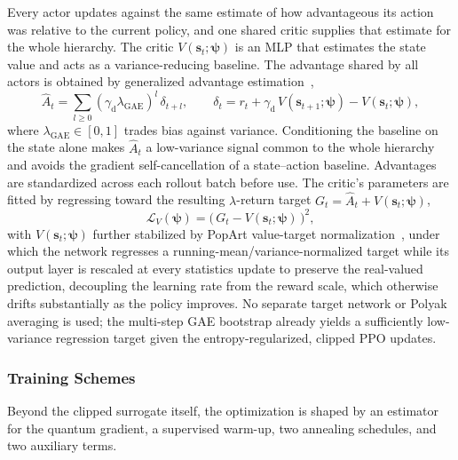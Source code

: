 \documentclass[12pt,onecolumn]{IEEEtran}
\begin{document}
Every actor updates against the same estimate of how advantageous its action was relative to the current policy, and one shared critic supplies that estimate for the whole hierarchy.
The critic $V(\mathbf{s}_t;\boldsymbol{\psi})$ is an MLP that estimates the state value and acts as a variance-reducing baseline.
The advantage shared by all actors is obtained by generalized advantage estimation~\cite{schulman2015high},
\begin{equation}
    \hat{A}_t = \sum_{l\ge 0} (\gamma_{\mathrm d}\lambda_{\mathrm{GAE}})^{l}\,\delta_{t+l},
    \qquad
    \delta_t = r_t + \gamma_{\mathrm d}\, V(\mathbf{s}_{t+1};\boldsymbol{\psi}) - V(\mathbf{s}_t;\boldsymbol{\psi}),
    \label{eq:gae}
\end{equation}
where $\lambda_{\mathrm{GAE}}\in[0,1]$ trades bias against variance. Conditioning the baseline on the state alone makes $\hat{A}_t$ a low-variance signal common to the whole hierarchy and avoids the gradient self-cancellation of a state--action baseline. Advantages are standardized across each rollout batch before use. The critic's parameters are fitted by regressing toward the resulting $\lambda$-return target $G_t = \hat{A}_t + V(\mathbf{s}_t;\boldsymbol{\psi})$,
\begin{equation}
    \mathcal{L}_V(\boldsymbol{\psi})
    =
    \bigl(\, G_t - V(\mathbf{s}_t;\boldsymbol{\psi}) \,\bigr)^{2},
    \label{eq:critic_loss}
\end{equation}
with $V(\mathbf{s}_t;\boldsymbol{\psi})$ further stabilized by PopArt value-target normalization~\cite{vanhasselt2016popart}, under which the network regresses a running-mean/variance-normalized target while its output layer is rescaled at every statistics update to preserve the real-valued prediction, decoupling the learning rate from the reward scale, which otherwise drifts substantially as the policy improves. No separate target network or Polyak averaging is used; the multi-step GAE bootstrap already yields a sufficiently low-variance regression target given the entropy-regularized, clipped PPO updates.

\subsubsection{Training Schemes}

Beyond the clipped surrogate itself, the optimization is shaped by an estimator for the quantum gradient, a supervised warm-up, two annealing schedules, and two auxiliary terms.
\end{document}
